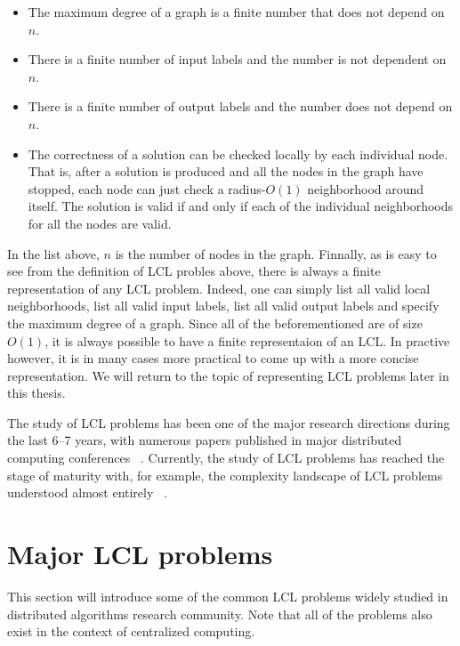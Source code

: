 \begin{itemize}

\item The maximum degree of a graph is a finite number that does not depend on $n$.

\item There is a finite number of input labels and the number is not dependent on $n$.

\item There is a finite number of output labels and the number does not depend on $n$.

\item The correctness of a solution can be checked locally by each individual node. That is,
after a solution is produced and all the nodes in the graph have stopped, each node can just
check a radius-$O(1)$ neighborhood around itself. The solution is valid if and only if each of
the individual neighborhoods for all the nodes are valid.

\end{itemize}
In the list above, $n$ is the number of nodes in the graph. Finnally, as is easy to see from the definition of LCL
probles
above, there is always a finite representation of any LCL problem. Indeed, one can simply list
all valid local neighborhoods, list all valid input labels, list all valid output
labels and specify the maximum degree of a graph. Since all of the beforementioned are
of size $O(1)$, it is always possible to have a finite representaion of an LCL.
In practive however, it is in many cases more practical to come up with
a more concise representation. We will return to the topic of representing LCL
problems later in this thesis.

The study of LCL problems has been one of the major research directions
during the last 6--7 years, with numerous papers published in major
distributed computing conferences
~\cite{Balliu2016, Chang2016, Brandt2017, Chang2017, Fischer2017a, Rozhon2019, Balliu2020-1, Balliu2020-2}.
Currently, the study of LCL problems has reached the stage of maturity with,
for example, the complexity landscape of LCL problems understood
almost entirely ~\cite{Suomela2020, Chang2020a}.

\section{Major LCL problems}

This section will introduce some of the common LCL problems
widely studied in distributed algorithms research community.
Note that all of the problems also exist in the context of 
centralized computing.

